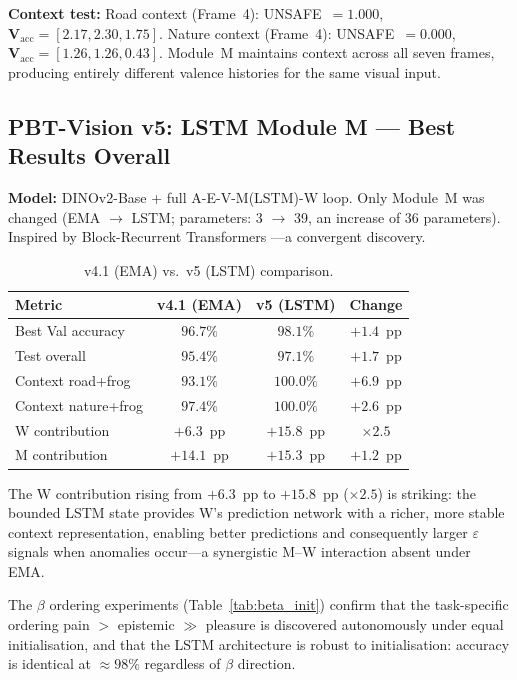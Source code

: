 \documentclass[12pt,a4paper]{article}
\begin{document}
\textbf{Context test:} Road context (Frame~4): UNSAFE~$= 1.000$,
$\mathbf{V}_{\mathrm{acc}} = [2.17, 2.30, 1.75]$. Nature context (Frame~4):
UNSAFE~$= 0.000$, $\mathbf{V}_{\mathrm{acc}} = [1.26, 1.26, 0.43]$.
Module~M maintains context across all seven frames, producing entirely
different valence histories for the same visual input.

\subsection{PBT-Vision v5: LSTM Module M --- Best Results Overall}

\textbf{Model:} DINOv2-Base + full A-E-V-M(LSTM)-W loop. Only Module~M was
changed (EMA $\to$ LSTM; parameters: 3 $\to$ 39, an increase of 36 parameters).
Inspired by Block-Recurrent Transformers \citep{hutchins2022}---a convergent
discovery.

\begin{table}[ht]
\centering
\caption{v4.1 (EMA) vs.\ v5 (LSTM) comparison.}
\label{tab:v5_compare}
\small
\begin{tabular}{@{}lccc@{}}
\toprule
\textbf{Metric} & \textbf{v4.1 (EMA)} & \textbf{v5 (LSTM)} & \textbf{Change}\\
\midrule
Best Val accuracy    & $96.7\%$ & $\mathbf{98.1\%}$  & $+1.4$~pp \\
Test overall         & $95.4\%$ & $97.1\%$  & $+1.7$~pp \\
Context road+frog    & $93.1\%$ & $\mathbf{100.0\%}$ & $+6.9$~pp \\
Context nature+frog  & $97.4\%$ & $100.0\%$ & $+2.6$~pp \\
W contribution       & $+6.3$~pp & $+15.8$~pp & $\times 2.5$ \\
M contribution       & $+14.1$~pp & $+15.3$~pp & $+1.2$~pp \\
\bottomrule
\end{tabular}
\end{table}

The W contribution rising from $+6.3$~pp to $+15.8$~pp ($\times 2.5$) is
striking: the bounded LSTM state provides W's prediction network with a richer,
more stable context representation, enabling better predictions and consequently
larger $\varepsilon$ signals when anomalies occur---a synergistic
M--W interaction absent under EMA.

The $\beta$ ordering experiments (Table~\ref{tab:beta_init}) confirm that the
task-specific ordering pain $>$ epistemic $\gg$ pleasure is discovered
autonomously under equal initialisation, and that the LSTM architecture is
robust to initialisation: accuracy is identical at $\approx 98\%$ regardless
of $\beta$ direction.
\end{document}
